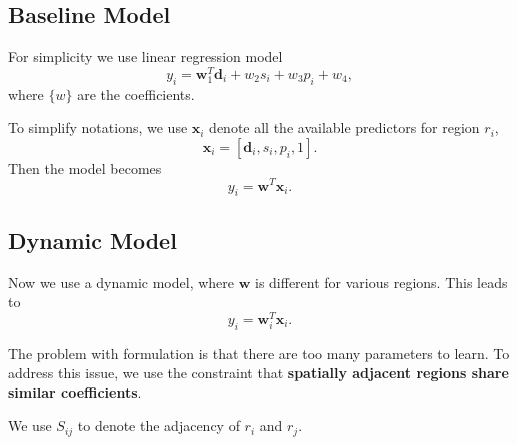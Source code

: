 \documentclass{article}
\begin{document}
\subsection{Baseline Model}

For simplicity we use linear regression model
\[
y_i = \mathbf{w}_1^T \mathbf{d}_i + w_2 s_i + w_3 p_i + w_4,
\]
where $\{ w \}$ are the coefficients.

To simplify notations, we use $\mathbf{x}_i$ denote all the available predictors for region $r_i$,
\[
\mathbf{x}_i = [ \mathbf{d}_i, s_i, p_i, 1 ].
\]
Then the model becomes 
\[
y_i = \mathbf{w}^T \mathbf{x}_i.
\]


\subsection{Dynamic Model}

Now we use a dynamic model, where $\mathbf{w}$ is different for various regions.
This leads to 
\[
y_i  = \mathbf{w}_i^T \mathbf{x}_i.
\]


The problem with formulation is that there are too many parameters to learn. To address this issue, we use the constraint that \textbf{spatially adjacent regions share similar coefficients}.

We use $S_{ij}$ to denote the adjacency of $r_i$ and $r_j$. 
\end{document}
